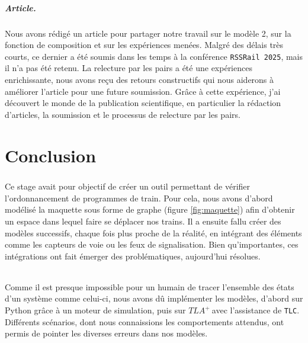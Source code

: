 \documentclass[oneside, a4paper, 11pt]{book}
\newcommand{\TLA}{\ensuremath{TLA^+~}}
\begin{document}
\paragraph{Article.}
Nous avons rédigé un article pour partager notre travail sur le modèle 2, sur la fonction de composition et sur les expériences menées. Malgré des délais très courts, ce dernier a été soumis dans les temps à la conférence \texttt{RSSRail 2025}, mais il n'a pas été retenu.
La relecture par les pairs a été une expériences enrichissante, nous avons reçu des retours constructifs qui nous aiderons à améliorer l'article pour une future soumission.
Grâce à cette expérience, j'ai découvert le monde de la publication scientifique, en particulier la rédaction d'articles, la soumission et le processus de relecture par les pairs. 








\chapter{Conclusion}

\paragraph{} Ce stage avait pour objectif de créer un outil permettant de vérifier l'ordonnancement de programmes de train.
Pour cela, nous avons d'abord modélisé la maquette sous forme de graphe (figure \ref{fig:maquette}) afin d'obtenir un espace dans lequel faire se déplacer nos trains.
Il a ensuite fallu créer des modèles successifs, chaque fois plus proche de la réalité, en intégrant des éléments comme les capteurs de voie ou les feux de signalisation.
Bien qu'importantes, ces intégrations ont fait émerger des problématiques, aujourd'hui résolues.

\subparagraph{}
Comme il est presque impossible pour un humain de tracer l'ensemble des états d'un système comme celui-ci, nous avons dû implémenter les modèles, d'abord sur Python grâce à un moteur de simulation, puis sur \TLA avec l'assistance de \texttt{TLC}.  
Différents scénarios, dont nous connaissions les comportements attendus, ont permis de pointer les diverses erreurs dans nos modèles.
\end{document}
